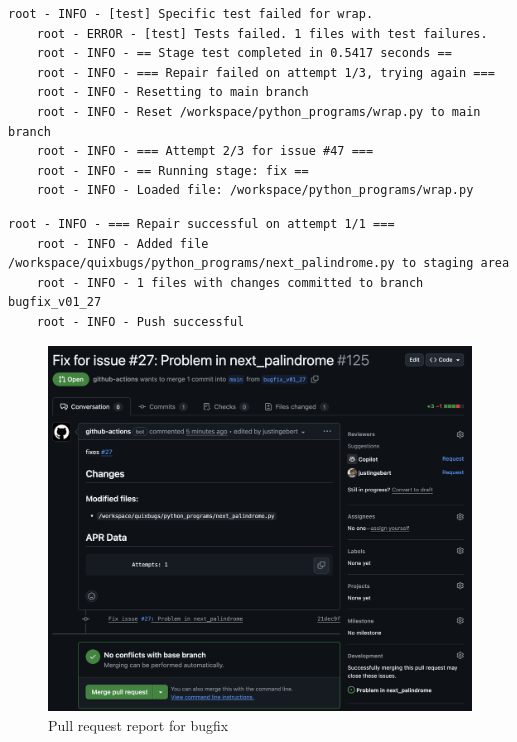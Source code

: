 \begin{lstlisting}[style=log, caption={Iterative patch generation log excerpt}, label={fig:retry}]
    root - INFO - [test] Specific test failed for wrap.
    root - ERROR - [test] Tests failed. 1 files with test failures.
    root - INFO - == Stage test completed in 0.5417 seconds ==
    root - INFO - === Repair failed on attempt 1/3, trying again ===
    root - INFO - Resetting to main branch
    root - INFO - Reset /workspace/python_programs/wrap.py to main branch
    root - INFO - === Attempt 2/3 for issue #47 ===
    root - INFO - == Running stage: fix ==
    root - INFO - Loaded file: /workspace/python_programs/wrap.py
\end{lstlisting}

\begin{lstlisting}[style=log, caption={Branch and commit created for bugfix}, label={lst:branch-commit}]
    root - INFO - === Repair successful on attempt 1/1 ===
    root - INFO - Added file /workspace/quixbugs/python_programs/next_palindrome.py to staging area
    root - INFO - 1 files with changes committed to branch bugfix_v01_27
    root - INFO - Push successful
\end{lstlisting}


\begin{figure}[H]
    \centering
    \includegraphics[width=1\textwidth]{images/verification/pr.png}
    \caption{Pull request report for bugfix}
    \label{fig:pr-report}
\end{figure}

